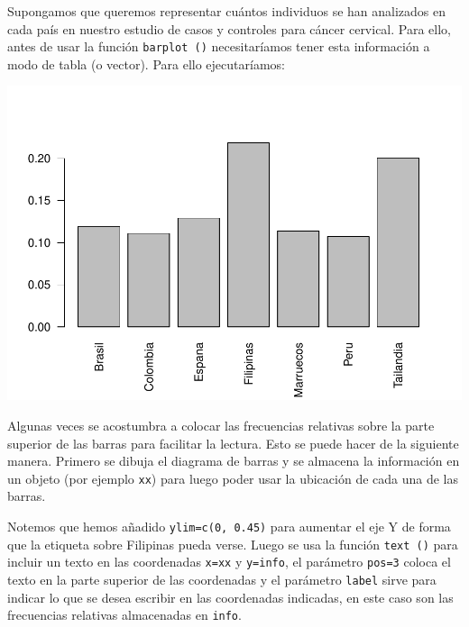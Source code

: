 \documentclass[
]{book}
\newenvironment{Shaded}{\begin{snugshade}}{\end{snugshade}}
\newcommand{\AttributeTok}[1]{\textcolor[rgb]{0.77,0.63,0.00}{#1}}
\newcommand{\DecValTok}[1]{\textcolor[rgb]{0.00,0.00,0.81}{#1}}
\newcommand{\FunctionTok}[1]{\textcolor[rgb]{0.00,0.00,0.00}{#1}}
\newcommand{\NormalTok}[1]{#1}
\newcommand{\OtherTok}[1]{\textcolor[rgb]{0.56,0.35,0.01}{#1}}
\newcommand{\SpecialCharTok}[1]{\textcolor[rgb]{0.00,0.00,0.00}{#1}}
\begin{document}
Supongamos que queremos representar cuántos individuos se han analizados en cada país en nuestro estudio de casos y controles para cáncer cervical. Para ello, antes de usar la función \texttt{barplot\ ()} necesitaríamos tener esta información a modo de tabla (o vector). Para ello ejecutaríamos:

\begin{Shaded}
\end{Shaded}

\includegraphics{fig/unnamed-chunk-100-1.pdf}

Algunas veces se acostumbra a colocar las frecuencias relativas sobre la parte superior de las barras para facilitar la lectura. Esto se puede hacer de la siguiente manera. Primero se dibuja el diagrama de barras y se almacena la información en un objeto (por ejemplo \texttt{xx}) para luego poder usar la ubicación de cada una de las barras.

Notemos que hemos añadido \texttt{ylim=c(0,\ 0.45)} para aumentar el eje Y de forma que la etiqueta sobre Filipinas pueda verse. Luego se usa la función \texttt{text\ ()} para incluir un texto en las coordenadas \texttt{x=xx} y \texttt{y=info}, el parámetro \texttt{pos=3} coloca el texto en la parte superior de las coordenadas y el parámetro \texttt{label} sirve para indicar lo que se desea escribir en las coordenadas indicadas, en este caso son las frecuencias relativas almacenadas en \texttt{info}.
\end{document}
